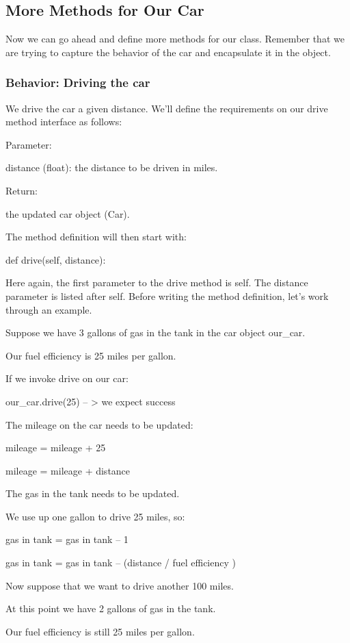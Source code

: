 \documentclass{article}
\begin{document}
\subsection{More Methods for Our Car}

Now we can go ahead and define more methods for our class.  Remember that we are trying to capture the behavior of the car and encapsulate it in the object.

\subsubsection{Behavior: Driving the car}

We drive the car a given distance.  We'll define the requirements on our drive method interface as follows:

 Parameter:

 distance (float):  the distance to be driven in miles.

 Return:

 the updated car object (Car).

The method definition will then start with:

def drive(self, distance):

Here again, the first parameter to the drive method is self.  The distance parameter is listed after self.
Before writing the method definition, let’s work through an example.

Suppose we have 3 gallons of gas in the tank in the car object our{\_}car.

Our fuel efficiency is 25 miles per gallon.

If we invoke drive on our car:

our{\_}car.drive(25) – > we expect success

The  mileage on the car needs to be updated:

mileage = mileage + 25

mileage = mileage + distance

The gas in the tank needs to be updated. 

We use up one gallon to drive 25 miles, so:

gas in tank = gas in tank – 1

gas in tank = gas in tank – (distance / fuel efficiency )

Now suppose that we want to drive another 100 miles.

At this point we have 2 gallons of gas in the tank.

Our fuel efficiency is still 25 miles per gallon.
\end{document}
